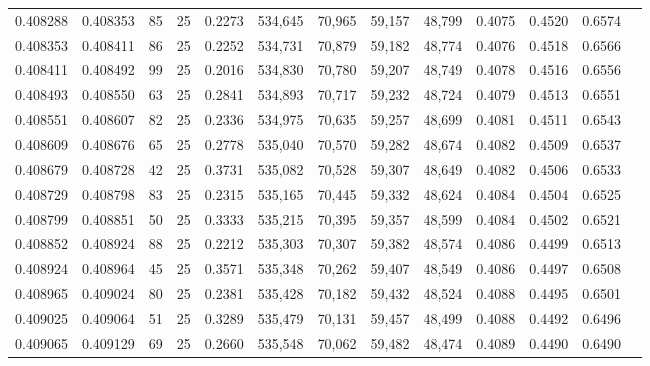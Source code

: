 \begin{tabular}{rrrrrrrrrrrrr}
0.408288 & 0.408353 &    85 &  25 &                                     0.2273 & 534,645 &  70,965 &  59,157 &  48,799 & 0.4075 & 0.4520 & 0.6574 \\
0.408353 & 0.408411 &    86 &  25 &                                     0.2252 & 534,731 &  70,879 &  59,182 &  48,774 & 0.4076 & 0.4518 & 0.6566 \\
0.408411 & 0.408492 &    99 &  25 &                                     0.2016 & 534,830 &  70,780 &  59,207 &  48,749 & 0.4078 & 0.4516 & 0.6556 \\
0.408493 & 0.408550 &    63 &  25 &                                     0.2841 & 534,893 &  70,717 &  59,232 &  48,724 & 0.4079 & 0.4513 & 0.6551 \\
0.408551 & 0.408607 &    82 &  25 &                                     0.2336 & 534,975 &  70,635 &  59,257 &  48,699 & 0.4081 & 0.4511 & 0.6543 \\
0.408609 & 0.408676 &    65 &  25 &                                     0.2778 & 535,040 &  70,570 &  59,282 &  48,674 & 0.4082 & 0.4509 & 0.6537 \\
0.408679 & 0.408728 &    42 &  25 &                                     0.3731 & 535,082 &  70,528 &  59,307 &  48,649 & 0.4082 & 0.4506 & 0.6533 \\
0.408729 & 0.408798 &    83 &  25 &                                     0.2315 & 535,165 &  70,445 &  59,332 &  48,624 & 0.4084 & 0.4504 & 0.6525 \\
0.408799 & 0.408851 &    50 &  25 &                                     0.3333 & 535,215 &  70,395 &  59,357 &  48,599 & 0.4084 & 0.4502 & 0.6521 \\
0.408852 & 0.408924 &    88 &  25 &                                     0.2212 & 535,303 &  70,307 &  59,382 &  48,574 & 0.4086 & 0.4499 & 0.6513 \\
0.408924 & 0.408964 &    45 &  25 &                                     0.3571 & 535,348 &  70,262 &  59,407 &  48,549 & 0.4086 & 0.4497 & 0.6508 \\
0.408965 & 0.409024 &    80 &  25 &                                     0.2381 & 535,428 &  70,182 &  59,432 &  48,524 & 0.4088 & 0.4495 & 0.6501 \\
0.409025 & 0.409064 &    51 &  25 &                                     0.3289 & 535,479 &  70,131 &  59,457 &  48,499 & 0.4088 & 0.4492 & 0.6496 \\
0.409065 & 0.409129 &    69 &  25 &                                     0.2660 & 535,548 &  70,062 &  59,482 &  48,474 & 0.4089 & 0.4490 & 0.6490 \\

\end{tabular}
